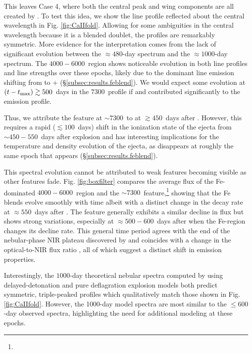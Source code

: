 \documentclass[twocolumn]{aastex63}
\begin{document}
This leaves Case 4, where both the central peak and wing components are all created by \CaII. To test this idea, we show the line profile reflected about the central wavelength in Fig. \ref{fig:CaIIfold}. Allowing for some ambiguities in the central wavelength because it is a blended doublet, the profiles are remarkably symmetric. More evidence for the \CaII interpretation comes from the lack of significant evolution between the $\approx 480$-day spectrum and the $\approx 1000$-day spectrum. The $4000-6000$~\AAA region shows noticeable evolution in both line profiles and line strengths over these epochs, likely due to the dominant line emission shifting from  to + (\S\ref{subsec:results.feblend}). We would expect some evolution at $(t-t_{\rm{max}})\gtrsim 500$~days in the $7300$~\AAA profile if  and  contributed significantly to the emission profile. 

Thus, we attribute the feature at $\sim 7300$~\AAA to \CaII at $\gtrsim 450$~days after \tmax. However, this requires a rapid ($\lesssim 100$~days) shift in the ionization state of the ejecta from $\sim 450-550$~days after explosion and has interesting implications for the temperature and density evolution of the ejecta, as  disappears at roughly the same epoch that 
\CaII appears (\S\ref{subsec:results.feblend}). 

This spectral evolution cannot be attributed to weak features becoming visible as other features fade. Fig. \ref{fig:boxfilter} compares the average flux of the Fe-dominated $4000-6000$~\AAA region and the $\sim 7300$~\AAA feature,\footnote{} showing that the Fe blends evolve smoothly with time albeit with a distinct change in the decay rate at $\approx 550$~days after \tmax. The \CaII feature generally exhibits a similar decline in flux but shows strong variations, especially at $\approx 500-600$~days after \tmax when the Fe-region changes its decline rate. This general time period agrees with the end of the nebular-phase NIR plateau discovered by \citet{graur2020} and coincides with a change in the optical-to-NIR flux ratio \citep{maguire2016, dimitriadis2017, graur2020}, all of which suggest a distinct shift in emission properties.

Interestingly, the $1000$-day theoretical nebular spectra computed by \citet{fransson2015} using delayed-detonation \citep[N100; ][]{seitenzahl2013} and pure deflagration \citep[W7; ][]{iwamoto1999} explosion models both predict symmetric, triple-peaked \CaII profiles which qualitatively match those shown in Fig. \ref{fig:CaIIfold}. However, the 1000-day model spectra are most similar to the $\leq 600$-day observed spectra, highlighting the need for additional modeling at these epochs.
\end{document}
